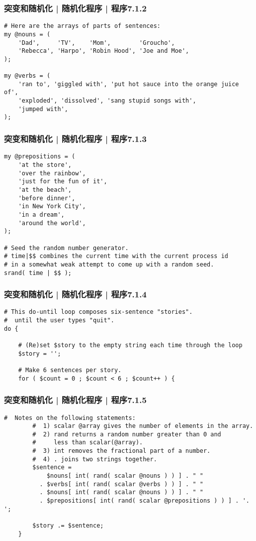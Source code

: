 \begin{frame}[fragile]
  \frametitle{突变和随机化 | 随机化程序 | 程序7.1.2}
\begin{lstlisting}[firstnumber=15,basicstyle=\small\tt]
# Here are the arrays of parts of sentences:
my @nouns = (
    'Dad',     'TV',    'Mom',        'Groucho',
    'Rebecca', 'Harpo', 'Robin Hood', 'Joe and Moe',
);

my @verbs = (
    'ran to', 'giggled with', 'put hot sauce into the orange juice of',
    'exploded', 'dissolved', 'sang stupid songs with',
    'jumped with',
);
\end{lstlisting}
\end{frame}

\begin{frame}[fragile]
  \frametitle{突变和随机化 | 随机化程序 | 程序7.1.3}
\begin{lstlisting}[firstnumber=27,basicstyle=\small\tt]
my @prepositions = (
    'at the store',
    'over the rainbow',
    'just for the fun of it',
    'at the beach',
    'before dinner',
    'in New York City',
    'in a dream',
    'around the world',
);

# Seed the random number generator.
# time|$$ combines the current time with the current process id
# in a somewhat weak attempt to come up with a random seed.
srand( time | $$ );
\end{lstlisting}
\end{frame}

\begin{frame}[fragile]
  \frametitle{突变和随机化 | 随机化程序 | 程序7.1.4}
\begin{lstlisting}[firstnumber=43]
# This do-until loop composes six-sentence "stories".
#  until the user types "quit".
do {

    # (Re)set $story to the empty string each time through the loop
    $story = '';

    # Make 6 sentences per story.
    for ( $count = 0 ; $count < 6 ; $count++ ) {
\end{lstlisting}
\end{frame}

\begin{frame}[fragile]
  \frametitle{突变和随机化 | 随机化程序 | 程序7.1.5}
\begin{lstlisting}[firstnumber=53,basicstyle=\footnotesize\tt,numberstyle=\scriptsize]
        #  Notes on the following statements:
        #  1) scalar @array gives the number of elements in the array.
        #  2) rand returns a random number greater than 0 and
        #     less than scalar(@array).
        #  3) int removes the fractional part of a number.
        #  4) . joins two strings together.
        $sentence =
            $nouns[ int( rand( scalar @nouns ) ) ] . " "
          . $verbs[ int( rand( scalar @verbs ) ) ] . " "
          . $nouns[ int( rand( scalar @nouns ) ) ] . " "
          . $prepositions[ int( rand( scalar @prepositions ) ) ] . '. ';

        $story .= $sentence;
    }
\end{lstlisting}
\end{frame}

